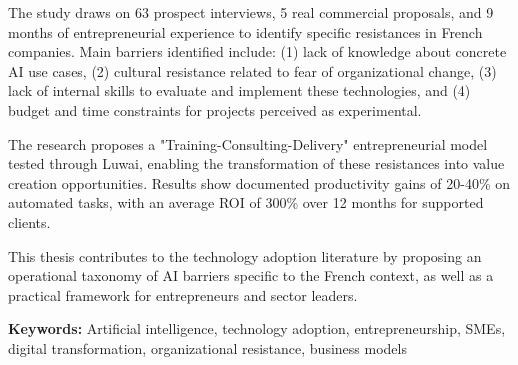 The study draws on 63 prospect interviews, 5 real commercial proposals, and 9 months of entrepreneurial experience to identify specific resistances in French companies. Main barriers identified include: (1) lack of knowledge about concrete AI use cases, (2) cultural resistance related to fear of organizational change, (3) lack of internal skills to evaluate and implement these technologies, and (4) budget and time constraints for projects perceived as experimental.

The research proposes a "Training-Consulting-Delivery" entrepreneurial model tested through Luwai, enabling the transformation of these resistances into value creation opportunities. Results show documented productivity gains of 20-40\% on automated tasks, with an average ROI of 300\% over 12 months for supported clients.

This thesis contributes to the technology adoption literature by proposing an operational taxonomy of AI barriers specific to the French context, as well as a practical framework for entrepreneurs and sector leaders.

\textbf{Keywords:} Artificial intelligence, technology adoption, entrepreneurship, SMEs, digital transformation, organizational resistance, business models
